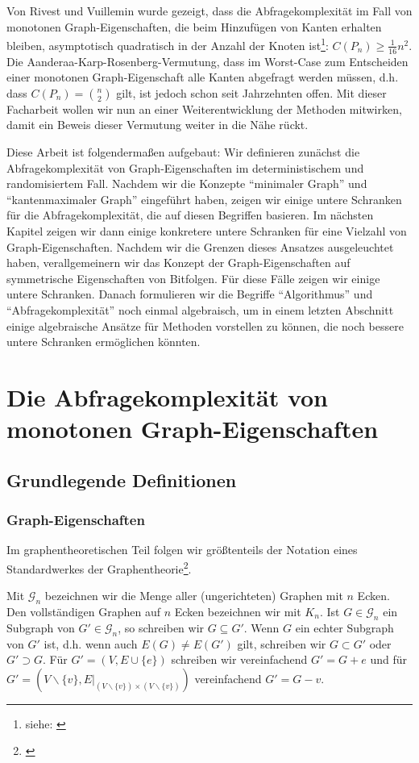 \documentclass[10pt,a4paper, footheight=1mm]{scrreprt}
\theoremstyle{definition}
\begin{document}
Von Rivest und Vuillemin wurde gezeigt,
dass die Abfragekomplexität
im Fall von monotonen Graph-Eigenschaften, die beim 
Hinzufügen von Kanten erhalten bleiben, asymptotisch
quadratisch in der Anzahl der Knoten
ist\footnote{siehe: \cite[Theorem 6]{Rivest}}: $C(P_n) \geq \frac{1}{16}n^2$.
Die Aanderaa-Karp-Rosenberg-Vermutung, dass im Worst-Case
zum Entscheiden einer monotonen Graph-Eigenschaft
alle Kanten abgefragt werden müssen, d.h. dass
$C(P_n)=\binom{n}{2}$ gilt, ist jedoch schon
seit Jahrzehnten offen. Mit dieser Facharbeit
wollen wir nun an einer Weiterentwicklung der
Methoden mitwirken, damit ein Beweis dieser Vermutung
weiter in die Nähe rückt.

Diese Arbeit ist folgendermaßen aufgebaut:
Wir definieren zunächst die Abfragekomplexität
von Graph-Eigenschaften im deterministischem und
randomisiertem Fall. Nachdem wir die Konzepte
"`minimaler Graph"' und "`kantenmaximaler Graph"'
eingeführt haben, zeigen wir einige untere Schranken
für die Abfragekomplexität, die auf diesen Begriffen
basieren. Im nächsten Kapitel zeigen wir dann einige
konkretere untere Schranken für eine Vielzahl von
Graph-Eigenschaften. Nachdem wir die Grenzen 
dieses Ansatzes ausgeleuchtet haben, verallgemeinern
wir das Konzept der Graph-Eigenschaften auf 
symmetrische Eigenschaften von Bitfolgen. Für
diese Fälle zeigen wir einige untere Schranken.
Danach formulieren wir die Begriffe "`Algorithmus"'
und "`Abfragekomplexität"' noch einmal algebraisch, um
in einem letzten Abschnitt
einige algebraische Ansätze für Methoden vorstellen zu
können, die noch bessere untere Schranken ermöglichen könnten.

\chapter{Die Abfragekomplexität von monotonen Graph-Eigenschaften}
\section{Grundlegende Definitionen}
\subsection{Graph-Eigenschaften}
Im graphentheoretischen Teil folgen wir größtenteils
der Notation eines Standardwerkes der Graphentheorie\footnote{\cite{diestel}}.

Mit $\mathcal{G}_n$ bezeichnen wir die Menge aller
(ungerichteten) Graphen mit $n$ Ecken.
Den vollständigen Graphen auf $n$ Ecken bezeichnen wir
mit $K_n$.
Ist $G \in \mathcal{G}_n$ ein Subgraph von $G' \in \mathcal{G}_n$,
so schreiben wir $G \subseteq G'$. Wenn $G$ ein
echter Subgraph von $G'$ ist, d.h. wenn auch $E(G) \neq E(G')$ gilt, schreiben
wir $G \subset G'$ oder $G' \supset G$.
Für $G' = (V, E \cup \{e\})$ schreiben wir vereinfachend
$G' = G + e$ und für 
$G' = (V \backslash \{v\}, E\big|_{(V \backslash \{v\})\times (V \backslash \{v\})})$ vereinfachend $G' = G - v$.
\end{document}
